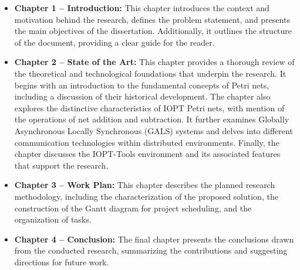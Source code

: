 \begin{itemize}
    \item \textbf{Chapter 1 – Introduction:}  
    This chapter introduces the context and motivation behind the research, defines the problem statement, and presents the main objectives of the dissertation. Additionally, it outlines the structure of the document, providing a clear guide for the reader.

   \item \textbf{Chapter 2 – State of the Art:}  
This chapter provides a thorough review of the theoretical and technological foundations that underpin the research. It begins with an introduction to the fundamental concepts of Petri nets, including a discussion of their historical development. The chapter also explores the distinctive characteristics of IOPT Petri nets, with mention of the operations of net addition and subtraction. It further examines Globally Asynchronous Locally Synchronous (GALS) systems and delves into different communication technologies within distributed environments. Finally, the chapter discusses the IOPT-Tools environment and its associated features that support the research.

    \item \textbf{Chapter 3 – Work Plan:}  
    This chapter describes the planned research methodology, including the characterization of the proposed solution, the construction of the Gantt diagram for project scheduling, and the organization of tasks.

    \item \textbf{Chapter 4 – Conclusion:}  
    The final chapter presents the conclusions drawn from the conducted research, summarizing the contributions and suggesting directions for future work.
\end{itemize}


